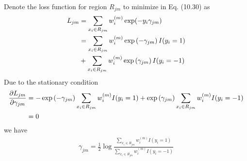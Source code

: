 \begin{exercise}
  Denote the loss function for region $R_{jm}$ to minimize in Eq.
  (10.30) as
  \begin{align}
    L_{jm} & = \sum_{x_i\in R_{jm}}w_i^{(m)}\exp(-y_i\gamma_{jm})\notag\\
    &= \sum_{x_i\in R_{jm}}w_i^{(m)}\exp\left(-\gamma_{jm}\right)I(y_i=1) \notag\\ 
    &+ \sum_{x_i\in R_{jm}}w_i^{(m)}\exp\left(\gamma_{jm}\right)I(y_i=-1) 
  \end{align}
  Due to the stationary condition
  \begin{align}
    \pdv{L_{jm}}{\gamma_{jm}} &= -\exp\left(-\gamma_{jm}\right) \sum_{x_i\in
    R_{jm}}w_i^{(m)}I(y_i=1) +\exp\left(\gamma_{jm}\right) \sum_{x_i\in
    R_{jm}}w_i^{(m)}I(y_i=-1) \notag\\
    &= 0
  \end{align}
  we have
  \begin{align}
    \gamma_{jm} = \frac{1}{2}\log\frac{\sum_{x_i\in
    R_{jm}}w_i^{(m)}I(y_i=1)} {\sum_{x_i\in
    R_{jm}}w_i^{(m)}I(y_i=-1)}
  \end{align}
\end{exercise}


